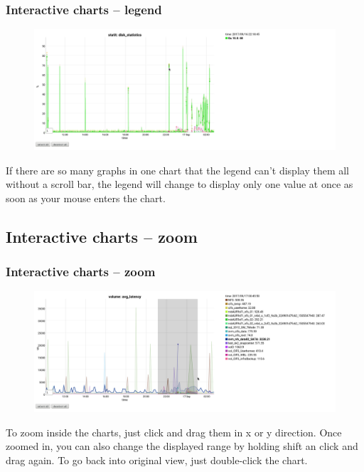 \documentclass[8pt]{beamer}
\begin{document}
\begin{frame}
\frametitle{Interactive charts -- legend} 
\begin{figure}
	\includegraphics[width=\textwidth]{../images/PicDat_singleValue.png}
\end{figure}

If there are so many graphs in one chart that the legend can't display them all without a scroll bar, the legend will change to display only one value at once as soon as your mouse enters the chart.
\end{frame}

\subsection{Interactive charts -- zoom}
\begin{frame}
\frametitle{Interactive charts -- zoom} 
\begin{figure}
	\includegraphics[width=\textwidth]{../images/PicDat_zoomVertical.png}
\end{figure}

To zoom inside the charts, just click and drag them in x or y direction. Once zoomed in, you can also change the displayed range by holding shift an click and drag again. To go back into original view, just double-click the chart.
\end{frame}
\end{document}
